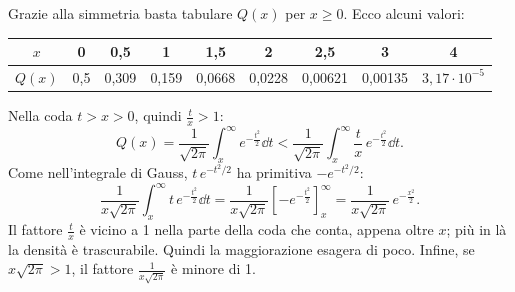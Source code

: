 Grazie alla simmetria basta tabulare $Q(x)$ per $x \geq 0$. Ecco alcuni valori:
\begin{center}
\renewcommand{\arraystretch}{1.25}
\begin{tabular}{@{}c|cccccccc@{}}
  $x$ & 0 & 0,5 & 1 & 1,5 & 2 & 2,5 & 3 & 4 \\ \hline
  $Q(x)$ & 0,5 & 0,309 & 0,159 & 0,0668 & 0,0228 & 0,00621 & 0,00135 & $3{,}17 \cdot 10^{-5}$
\end{tabular}
\end{center}


\begin{dimostrazione}
 Nella coda $t > x > 0$, quindi $\frac{t}{x} > 1$:
\[ Q(x) = \frac{1}{\sqrt{2\pi}} \int_x^{\infty} e^{-\frac{t^2}{2}} \dd t < \frac{1}{\sqrt{2\pi}} \int_x^{\infty}
   \frac{t}{x}\, e^{-\frac{t^2}{2}} \dd t . \]
 Come nell'integrale di Gauss, $t\, e^{-t^2/2}$ ha primitiva $-e^{-t^2/2}$:
\[ \frac{1}{x\sqrt{2\pi}} \int_x^{\infty} t\, e^{-\frac{t^2}{2}} \dd t = \frac{1}{x\sqrt{2\pi}} \left[ -e^{-\frac{t^2}{2}}
   \right]_x^{\infty} = \frac{1}{x\sqrt{2\pi}}\, e^{-\frac{x^2}{2}} . \]
 Il fattore $\frac{t}{x}$ è vicino a 1 nella parte della coda
che conta, appena oltre $x$; più in là la densità è trascurabile. Quindi la maggiorazione esagera di poco. Infine, se
$x\sqrt{2\pi} > 1$, il fattore $\frac{1}{x\sqrt{2\pi}}$ è minore di 1.
\end{dimostrazione}

